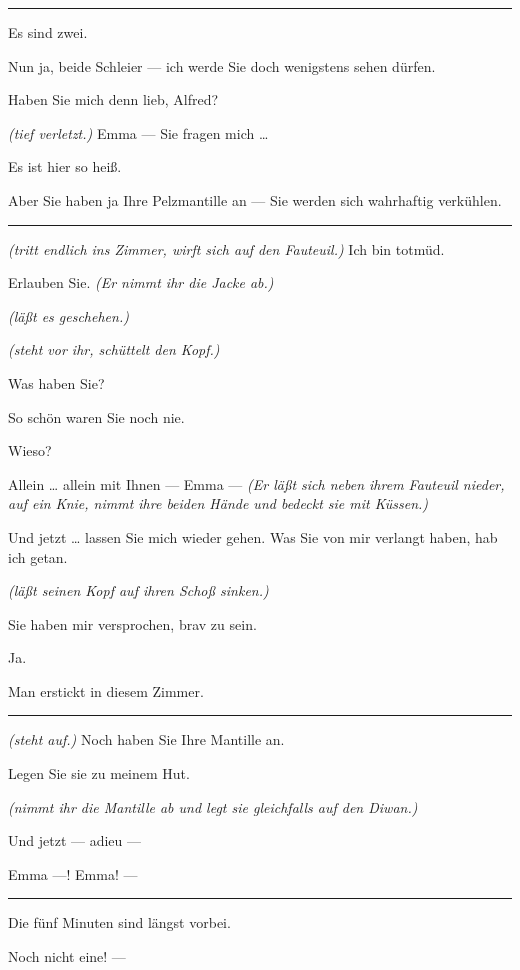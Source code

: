 \documentclass[
	final,
	a4paper,
	ngerman,
	mpinclude = true, %
	twoside = true,
	open = right,
	cleardoublepage = plain,
	DIV = 13,
	BCOR = 1cm,
	titlepage = firstiscover,
	]{scrbook}
\newcommand{\direction}[1]{\textit{(#1)}}
\newenvironment{deletion}{%
		\vspace{0.25\baselineskip}
		\hrule
		\vspace{0.25\baselineskip}
		\color{darkgray}
	}{
		\color{black}
		\vspace{0.25\baselineskip}
		\hrule 
		\vspace{0.25\baselineskip}
	}
\newcommand{\thecharacter}[1]{\textup{\textsc{#1}}\xspace}
\newcommand{\theherr}{\thecharacter{Junger Herr}}
\newcommand{\thefrau}{\thecharacter{Junge Frau}}
\newcommand{\character}[1]{\item[#1:]}
\newcommand{\herr}{\character{\theherr}}
\newcommand{\frau}{\character{\thefrau}}
\begin{document}
\begin{play}
\begin{deletion}
	\frau
	Es sind zwei.

	\herr
	Nun ja, beide Schleier --- ich werde Sie doch wenigstens sehen dürfen.

	\frau
	Haben Sie mich denn lieb, Alfred?

	\herr
	\direction{tief verletzt.} Emma --- Sie fragen mich \ldots{}

	\frau
	Es ist hier so heiß.

	\herr
	Aber Sie haben ja Ihre Pelzmantille an --- Sie werden sich wahrhaftig verkühlen.
	\end{deletion}

	\frau
	\direction{tritt endlich ins Zimmer, wirft sich auf den Fauteuil.} Ich bin totmüd.

	\herr
	Erlauben Sie. \direction{Er nimmt ihr die Jacke ab.}

	\frau
	\direction{läßt es geschehen.}

	\herr
	\direction{steht vor ihr, schüttelt den Kopf.}

	\frau
	Was haben Sie?

	\herr
	So schön waren Sie noch nie.

	\frau
	Wieso?

	\herr
	Allein \ldots{} allein mit Ihnen --- Emma --- \direction{Er läßt sich neben ihrem Fauteuil nieder, auf ein Knie, nimmt ihre beiden Hände und bedeckt sie mit Küssen.}

	\frau
	Und jetzt \ldots{} lassen Sie mich wieder gehen. Was Sie von mir verlangt haben, hab ich getan.

	\herr
	\direction{läßt seinen Kopf auf ihren Schoß sinken.}

	\frau
	Sie haben mir versprochen, brav zu sein.

	\herr
	Ja.

	\frau
	Man erstickt in diesem Zimmer.
	\begin{deletion}
	\herr
	\direction{steht auf.} Noch haben Sie Ihre Mantille an.

	\frau
	Legen Sie sie zu meinem Hut.

	\herr
	\direction{nimmt ihr die Mantille ab und legt sie gleichfalls auf den Diwan.}

	\frau
	Und jetzt --- adieu ---

	\herr
	Emma ---! Emma! ---

	\frau
	\end{deletion}
	Die fünf Minuten sind längst vorbei.

	\herr
	Noch nicht eine! ---


\end{play}
\end{document}
